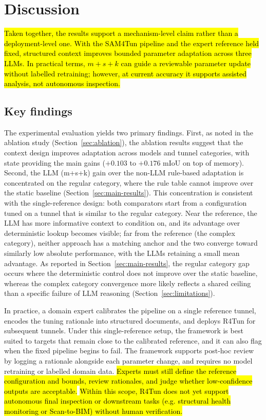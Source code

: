 \documentclass[a4paper,fleqn]{cas-dc}
\begin{document}
{%
\section{Discussion}\label{sec:discussion}

\hl{Taken together, the results support a mechanism-level claim rather than a deployment-level one. With the SAM4Tun pipeline and the expert reference held fixed, structured context improves bounded parameter adaptation across three LLMs. In practical terms, \mbox{$m+s+k$} can guide a reviewable parameter update without labelled retraining; however, at current accuracy it supports assisted analysis, not autonomous inspection.}

\subsection{Key findings}

The experimental evaluation yields two primary findings. First, as noted in the ablation study (Section~\ref{sec:ablation}), the ablation results suggest that the context design improves adaptation across models and tunnel categories, with state providing the main gains ($+0.103$ to $+0.176$ mIoU on top of memory). Second, the LLM (m+s+k) gain over the non-LLM rule-based adaptation is concentrated on the regular category, where the rule table cannot improve over the static baseline (Section~\ref{sec:main-results}). This concentration is consistent with the single-reference design: both comparators start from a configuration tuned on a tunnel that is similar to the regular category. Near the reference, the LLM has more informative context to condition on, and its advantage over deterministic lookup becomes visible; far from the reference (the complex category), neither approach has a matching anchor and the two converge toward similarly low absolute performance, with the LLMs retaining a small mean advantage. As reported in Section~\ref{sec:main-results}, the regular category gap occurs where the deterministic control does not improve over the static baseline, whereas the complex category convergence more likely reflects a shared ceiling than a specific failure of LLM reasoning (Section~\ref{sec:limitations}).


In practice, a domain expert calibrates the pipeline on a single reference tunnel, encodes the tuning rationale into structured documents, and deploys R4Tun for subsequent tunnels. Under this single-reference setup, the framework is best suited to targets that remain close to the calibrated reference, and it can also flag when the fixed pipeline begins to fail. The framework supports post-hoc review by logging a rationale alongside each parameter change, and requires no model retraining or labelled domain data. \hl{Experts must still define the reference configuration and bounds, review rationales, and judge whether low-confidence outputs are acceptable.} \hl{Within this scope, R4Tun does not yet support autonomous final inspection or downstream tasks (e.g. structural health monitoring or Scan-to-BIM) without human verification.}


}
\end{document}
